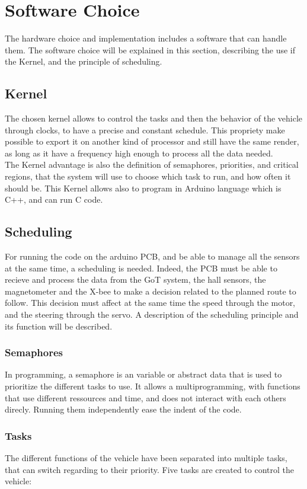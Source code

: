 \section{Software Choice}
The hardware choice and implementation includes a software that can handle them. The software choice will be explained in this section, describing the use if the Kernel, and the principle of scheduling.

\subsection{Kernel}
The chosen kernel allows to control the tasks and then the behavior of the vehicle through clocks, to have a precise and constant schedule. This propriety make possible to export it on another kind of processor and still have the same render, as long as it have a frequency high enough to process all the data needed.\\
The Kernel advantage is also the definition of semaphores, priorities, and critical regions, that the system will use to choose which task to run, and how often it should be. This Kernel allows also to program in Arduino language which is C++, and can run C code.

\subsection{Scheduling}\label{sec:scheduling}
For running the code on the arduino PCB, and be able to manage all the sensors at the same time, a scheduling is needed. Indeed, the PCB must be able to recieve and process the data from the GoT system, the hall sensors, the magnetometer and the X-bee to make a decision related to the planned route to follow. This decision must affect at the same time the speed through the motor, and the steering through the servo.
A description of the scheduling principle and its function will be described.

\subsubsection{Semaphores}
In programming, a semaphore is an variable or abstract data that is used to prioritize the different tasks to use. It allows a multiprogramming, with functions that use different ressources and time, and does not interact with each others direcly. Running them independently ease the indent of the code.

\subsubsection{Tasks}
The different functions of the vehicle have been separated into multiple tasks, that can switch regarding to their priority. Five tasks are created to control the vehicle:

